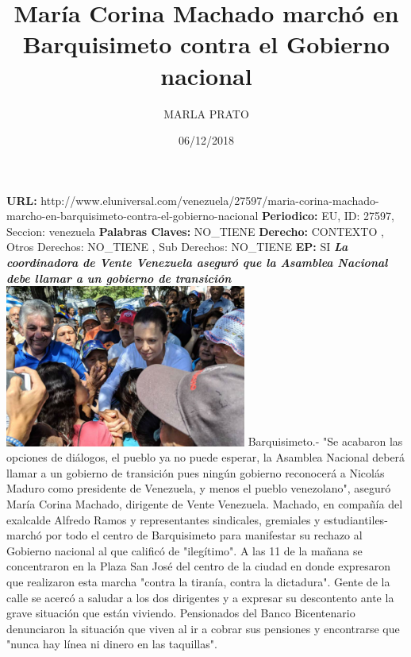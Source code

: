 \documentclass{article}%
\title{\textbf{María Corina Machado marchó en Barquisimeto contra el Gobierno nacional}}%
\author{MARLA PRATO}%
\date{06/12/2018}%
\begin{document}
%
\normalsize%
\maketitle%
\textbf{URL: }%
http://www.eluniversal.com/venezuela/27597/maria{-}corina{-}machado{-}marcho{-}en{-}barquisimeto{-}contra{-}el{-}gobierno{-}nacional\newline%
%
\textbf{Periodico: }%
EU, %
ID: %
27597, %
Seccion: %
venezuela\newline%
%
\textbf{Palabras Claves: }%
NO\_TIENE\newline%
%
\textbf{Derecho: }%
CONTEXTO%
, Otros Derechos: %
NO\_TIENE%
, Sub Derechos: %
NO\_TIENE%
\newline%
%
\textbf{EP: }%
SI\newline%
\newline%
%
\textbf{\textit{La coordinadora de Vente Venezuela aseguró que la Asamblea Nacional debe llamar a un gobierno de transición}}%
\newline%
\newline%
%
\includegraphics[width=300px]{226.jpeg}%
\newline%
%
Barquisimeto.{-} "Se acabaron las opciones de diálogos, el pueblo ya no puede esperar, la Asamblea Nacional deberá llamar a un gobierno de transición pues ningún gobierno reconocerá a Nicolás Maduro como presidente de Venezuela, y menos el pueblo venezolano", aseguró María Corina Machado, dirigente de Vente Venezuela.%
\newline%
%
Machado, en compañía del exalcalde Alfredo Ramos y representantes sindicales, gremiales y estudiantiles{-} marchó por todo el centro de Barquisimeto para manifestar su rechazo al Gobierno nacional al que calificó de "ilegítimo".%
\newline%
%
A las 11 de la mañana se concentraron en la Plaza San José del centro de la ciudad en donde expresaron que realizaron esta marcha "contra la tiranía, contra la dictadura".%
\newline%
%
Gente de la calle se acercó a saludar a los dos dirigentes y a expresar su descontento ante la grave situación que están viviendo. Pensionados del Banco Bicentenario denunciaron la situación que viven al ir a cobrar sus pensiones y encontrarse que "nunca hay línea ni dinero en las taquillas".%
\end{document}
